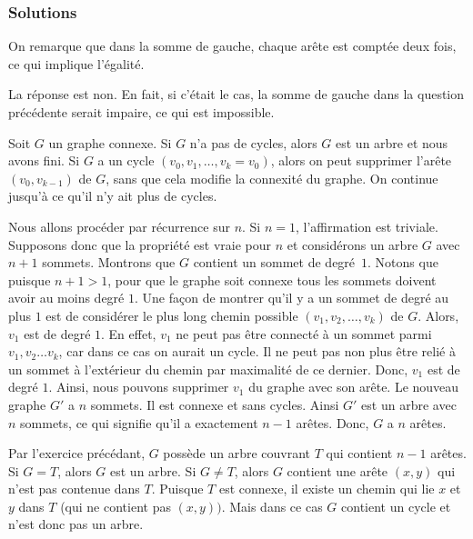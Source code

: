 \subsubsection{Solutions}


\begin{sol}
On remarque que dans la somme de gauche, chaque arête est comptée deux fois, ce qui implique l’égalité.
\end{sol}


\begin{sol}
La réponse est non. En fait, si c’était le cas, la somme de gauche dans la question précédente serait impaire, ce qui est impossible.
\end{sol}


\begin{sol}
Soit $G$ un graphe connexe. Si $G$ n'a pas de cycles, alors $G$ est un arbre et nous avons fini. Si $G$ a un cycle $(v_0, v_1,\ldots ,v_k = v_0)$, alors on peut supprimer l'arête $(v_0, v_{k-1})$ de $G$, sans que cela modifie la connexité du graphe. On continue jusqu’à ce qu’il n’y ait plus de cycles.
\end{sol}


\begin{sol}
Nous allons procéder par récurrence sur $n$. Si $n = 1$, l'affirmation est triviale. Supposons donc que la propriété est vraie pour $n$ et considérons un arbre $G$ avec $n+1$ sommets. Montrons que $G$ contient un sommet de degré~$1$. Notons que puisque $n + 1 > 1$, pour que le graphe soit connexe tous les sommets doivent avoir au moins degré $1$. Une façon de montrer qu'il y a un sommet de degré au plus $1$ est de considérer le plus long chemin possible $(v_1, v_2, \ldots, v_k)$ de $G$. Alors, $v_1$ est de degré $1$. En effet, $v_1$ ne peut pas être connecté à un sommet parmi $v_1,v_2 \ldots v_k$, car dans ce cas on aurait un cycle. Il ne peut pas non plus être relié à un sommet à l’extérieur du chemin par maximalité de ce dernier. Donc, $v_1$ est de degré $1$. Ainsi, nous pouvons supprimer $v_1$ du graphe avec son arête.
Le nouveau graphe $G'$ a $n$ sommets. Il est connexe et sans cycles. Ainsi $G'$ est un arbre avec $n$ sommets, ce qui signifie qu'il a exactement $n-1$ arêtes. Donc, $G$ a $n$ arêtes.
\end{sol}


\begin{sol}
 Par l’exercice précédant, $G$ possède un arbre couvrant $T$ qui contient $n-1$ arêtes. Si $G=T$, alors $G$ est un arbre. Si $G \ne T$, alors $G$ contient une arête $(x,y)$ qui n’est pas contenue dans $T$. Puisque $T$ est connexe, il existe un chemin qui lie $x$ et $y$ dans $T$ (qui ne contient pas $(x,y))$. Mais dans ce cas $G$ contient un cycle et n’est donc pas un arbre.
\end{sol}


